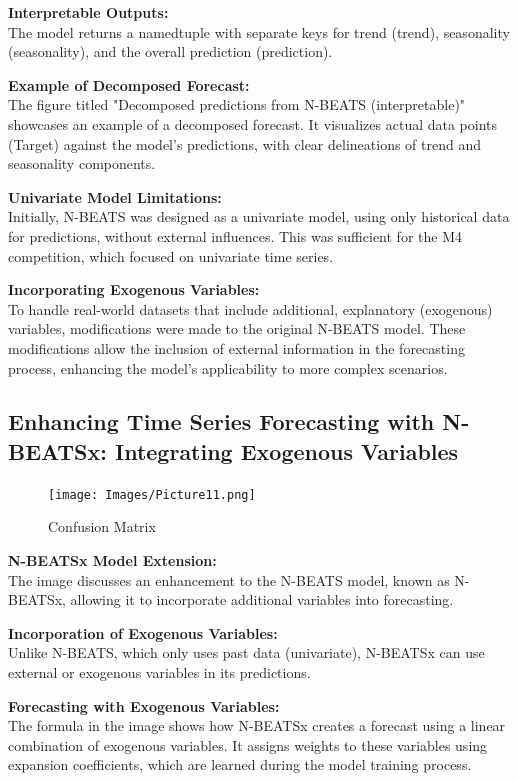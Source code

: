 \documentclass{article}
\begin{document}
\textbf{Interpretable Outputs:} \\
The model returns a namedtuple with separate keys for trend (trend), seasonality (seasonality), and the overall prediction (prediction).

\textbf{Example of Decomposed Forecast:} \\
The figure titled "Decomposed predictions from N-BEATS (interpretable)" showcases an example of a decomposed forecast. It visualizes actual data points (Target) against the model's predictions, with clear delineations of trend and seasonality components.

\textbf{Univariate Model Limitations:} \\
Initially, N-BEATS was designed as a univariate model, using only historical data for predictions, without external influences. This was sufficient for the M4 competition, which focused on univariate time series.

\textbf{Incorporating Exogenous Variables:} \\
To handle real-world datasets that include additional, explanatory (exogenous) variables, modifications were made to the original N-BEATS model. These modifications allow the inclusion of external information in the forecasting process, enhancing the model's applicability to more complex scenarios.

\subsection{Enhancing Time Series Forecasting with N-BEATSx: Integrating Exogenous Variables}

\begin{figure}
    \centering
    \texttt{[image: Images/Picture11.png]}
    \caption{Confusion Matrix}
    \label{fig:enter-labe}
\end{figure}


\textbf{N-BEATSx Model Extension:} \\
The image discusses an enhancement to the N-BEATS model, known as N-BEATSx, allowing it to incorporate additional variables into forecasting.

\textbf{Incorporation of Exogenous Variables:} \\
Unlike N-BEATS, which only uses past data (univariate), N-BEATSx can use external or exogenous variables in its predictions.

\textbf{Forecasting with Exogenous Variables:} \\
The formula in the image shows how N-BEATSx creates a forecast using a linear combination of exogenous variables. It assigns weights to these variables using expansion coefficients, which are learned during the model training process.
\end{document}
